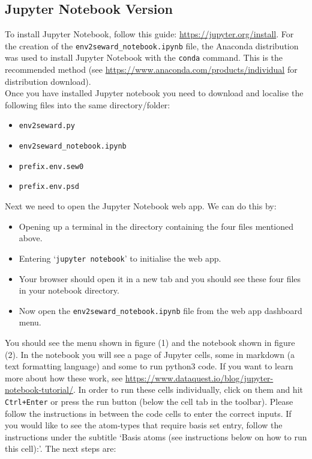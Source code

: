 \documentclass[10pt]{article}
\begin{document}
\subsection{Jupyter Notebook Version}
To install Jupyter Notebook, follow this guide: \url{https://jupyter.org/install}. For the creation of the \texttt{env2seward\_notebook.ipynb} file, the Anaconda distribution was used to install Jupyter Notebook with the \texttt{conda} command. This is the recommended method (see \url{https://www.anaconda.com/products/individual} for distribution download). 
\\
Once you have installed Jupyter notebook you need to download and localise the following files into the same directory/folder:

\begin{itemize}
	\item \texttt{env2seward.py}
	\item \texttt{env2seward\_notebook.ipynb}
	\item \texttt{prefix.env.sew0}
	\item \texttt{prefix.env.psd}
\end{itemize}
Next we need to open the Jupyter Notebook web app. We can do this by:

\begin{itemize}
	\item Opening up a terminal in the directory containing the four files mentioned above.
	\item Entering `\texttt{jupyter notebook}' to initialise the web app.
	\item Your browser should open it in a new tab and you should see these four files in your notebook directory.
	\item Now open the \texttt{env2seward\_notebook.ipynb} file from the web app dashboard menu.
\end{itemize}

You should see the menu shown in figure (1) and the notebook shown in figure (2). In the notebook you will see a page of Jupyter cells, some in markdown (a text formatting language) and some to run python3 code. If you want to learn more about how these work, see \url{https://www.dataquest.io/blog/jupyter-notebook-tutorial/}. In order to run these cells individually, click on them and hit \texttt{Ctrl+Enter} or press the run button (below the cell tab in the toolbar). 
Please follow the instructions in between the code cells to enter the correct inputs. If you would like to see the atom-types that require basis set entry, follow the instructions under the subtitle `Basis atoms (see instructions below on how to run this cell):'. The next steps are:
\end{document}
